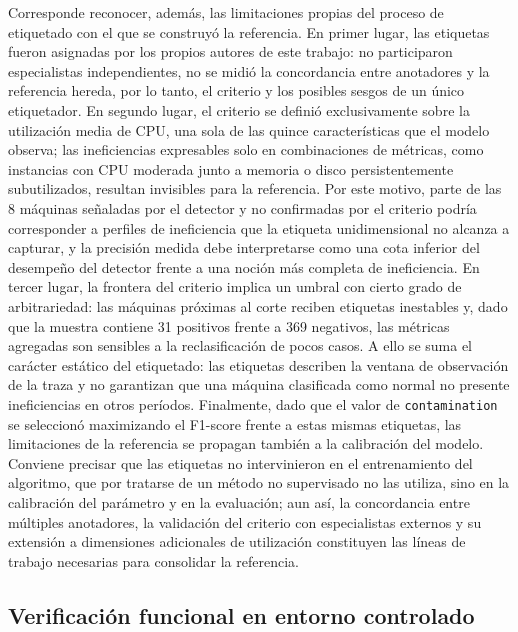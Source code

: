 Corresponde reconocer, además, las limitaciones propias del proceso de etiquetado con el que se construyó la referencia. En primer lugar, las etiquetas fueron asignadas por los propios autores de este trabajo: no participaron especialistas independientes, no se midió la concordancia entre anotadores y la referencia hereda, por lo tanto, el criterio y los posibles sesgos de un único etiquetador. En segundo lugar, el criterio se definió exclusivamente sobre la utilización media de CPU, una sola de las quince características que el modelo observa; las ineficiencias expresables solo en combinaciones de métricas, como instancias con CPU moderada junto a memoria o disco persistentemente subutilizados, resultan invisibles para la referencia. Por este motivo, parte de las 8 máquinas señaladas por el detector y no confirmadas por el criterio podría corresponder a perfiles de ineficiencia que la etiqueta unidimensional no alcanza a capturar, y la precisión medida debe interpretarse como una cota inferior del desempeño del detector frente a una noción más completa de ineficiencia. En tercer lugar, la frontera del criterio implica un umbral con cierto grado de arbitrariedad: las máquinas próximas al corte reciben etiquetas inestables y, dado que la muestra contiene 31 positivos frente a 369 negativos, las métricas agregadas son sensibles a la reclasificación de pocos casos. A ello se suma el carácter estático del etiquetado: las etiquetas describen la ventana de observación de la traza y no garantizan que una máquina clasificada como normal no presente ineficiencias en otros períodos. Finalmente, dado que el valor de \texttt{contamination} se seleccionó maximizando el F1-score frente a estas mismas etiquetas, las limitaciones de la referencia se propagan también a la calibración del modelo. Conviene precisar que las etiquetas no intervinieron en el entrenamiento del algoritmo, que por tratarse de un método no supervisado no las utiliza, sino en la calibración del parámetro y en la evaluación; aun así, la concordancia entre múltiples anotadores, la validación del criterio con especialistas externos y su extensión a dimensiones adicionales de utilización constituyen las líneas de trabajo necesarias para consolidar la referencia.

\subsection{Verificación funcional en entorno controlado}

